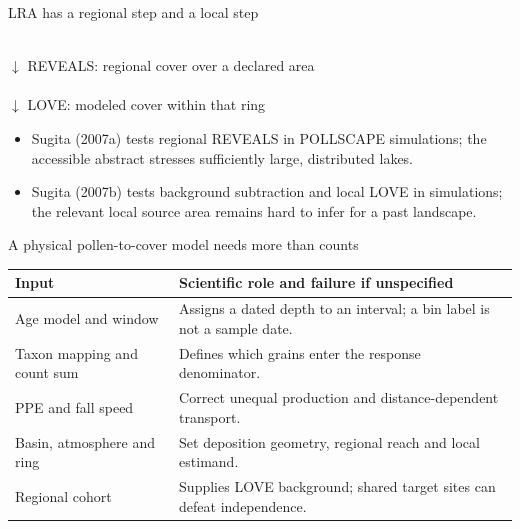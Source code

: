 \begin{frame}{LRA has a regional step and a local step}
\small
\begin{center}
\\[0.5em]
$\downarrow$ REVEALS: regional cover over a declared area\\[0.7em]
\\[0.5em]
$\downarrow$ LOVE: modeled cover within that ring
\end{center}
\begin{itemize}
\item Sugita (2007a) tests regional REVEALS in POLLSCAPE simulations; the accessible abstract stresses sufficiently large, distributed lakes.
\item Sugita (2007b) tests background subtraction and local LOVE in simulations; the relevant local source area remains hard to infer for a past landscape.
\end{itemize}
\end{frame}

\begin{frame}{A physical pollen-to-cover model needs more than counts}
\small
\begin{tabular}{p{}p{}}
\toprule
Input & Scientific role and failure if unspecified \\
\midrule
Age model and window & Assigns a dated depth to an interval; a bin label is not a sample date. \\
Taxon mapping and count sum & Defines which grains enter the response denominator. \\
PPE and fall speed & Correct unequal production and distance-dependent transport. \\
Basin, atmosphere and ring & Set deposition geometry, regional reach and local estimand. \\
Regional cohort & Supplies LOVE background; shared target sites can defeat independence. \\
\bottomrule
\end{tabular}
\end{frame}

